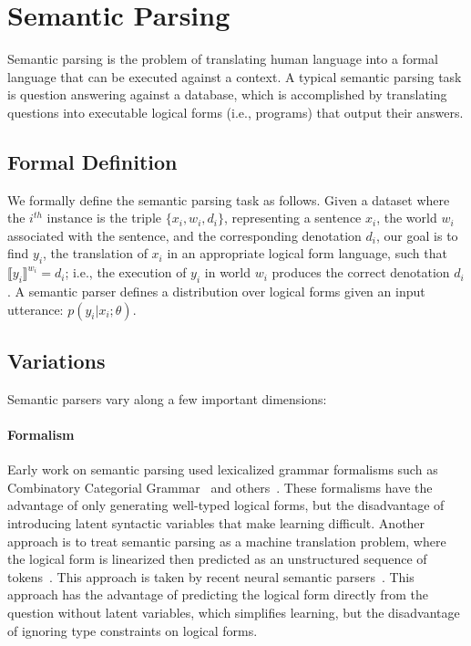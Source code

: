 \section{Semantic Parsing}
Semantic parsing is the problem of translating human language into a formal
language that can be executed against a context. A
typical semantic parsing task is question answering against a database, which
is accomplished by translating questions into executable logical forms (i.e.,
programs) that output their answers.

\subsection{Formal Definition}\label{sec:semantic_parsing_formal_definition}
We formally define the semantic parsing task as
follows. Given a dataset where the $i^{th}$ instance is the triple $\{x_i, w_i,
d_i\}$, representing a sentence $x_i$, the world $w_i$ associated with the
sentence, and the corresponding denotation $d_i$, our goal is to find $y_i$,
the translation of $x_i$ in an appropriate logical form language, such that
$\llbracket y_i\rrbracket^{w_i} = d_i$; i.e., the execution of $y_i$ in world $w_i$ produces
the correct denotation $d_i$.  A semantic parser defines a distribution over
logical forms given an input utterance: $p(y_i|x_i; \theta)$.

\subsection{Variations}
Semantic parsers vary along a few important dimensions:
\paragraph{Formalism} Early work on semantic parsing used lexicalized grammar
formalisms such as Combinatory Categorial
Grammar~\cite{zettlemoyer05,zettlemoyer2007online,kwiatkowski2011lexical,kwiatkowski2013,krishnamurthy2012weakly,artzi2013}
and
others~\cite{liang2011learning,berant2013,zhao2015,wong2006learning,wong2007learning}.
These formalisms have the advantage of only generating well-typed logical
forms, but the disadvantage of introducing latent syntactic variables that make
learning difficult. Another approach is to treat semantic parsing as a machine
translation problem, where the logical form is linearized then predicted as an
unstructured sequence of tokens~\citep{andreas2013}.  This approach is taken by
recent neural semantic parsers~\citep{jia2016,dong2016,locascio2016,ling2016}.
This approach has the advantage of predicting the logical form directly from
the question without latent variables, which simplifies learning, but the
disadvantage of ignoring type constraints on logical forms.

